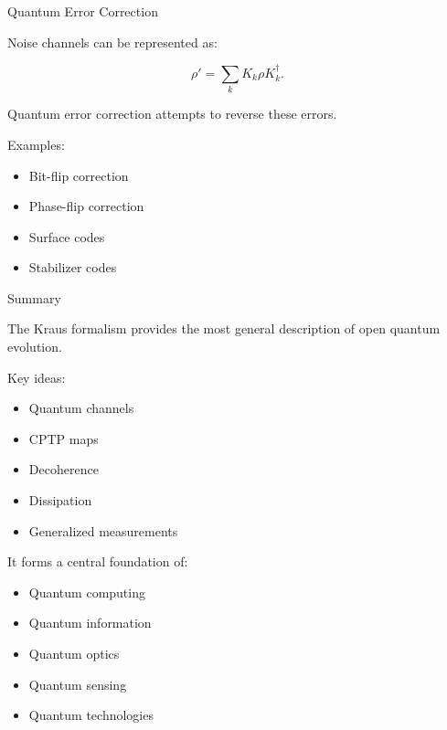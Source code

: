 \documentclass{beamer}
\begin{document}
\begin{frame}{Quantum Error Correction}

Noise channels can be represented as:

\[
\rho'
=
\sum_k
K_k \rho K_k^\dagger.
\]

\vspace{0.4cm}

Quantum error correction attempts to reverse these errors.

\vspace{0.4cm}

Examples:
\begin{itemize}
    \item Bit-flip correction
    \item Phase-flip correction
    \item Surface codes
    \item Stabilizer codes
\end{itemize}

\end{frame}

\begin{frame}{Summary}

The Kraus formalism provides the most general description
of open quantum evolution.

\vspace{0.4cm}

Key ideas:

\begin{itemize}
    \item Quantum channels
    \item CPTP maps
    \item Decoherence
    \item Dissipation
    \item Generalized measurements
\end{itemize}

\vspace{0.4cm}

It forms a central foundation of:
\begin{itemize}
    \item Quantum computing
    \item Quantum information
    \item Quantum optics
    \item Quantum sensing
    \item Quantum technologies
\end{itemize}

\end{frame}

\end{document}
